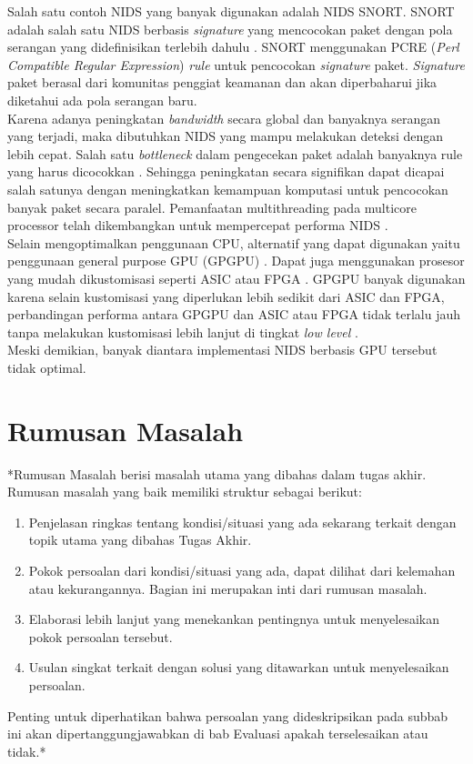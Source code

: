 Salah satu contoh NIDS yang banyak digunakan adalah NIDS SNORT. SNORT adalah salah satu NIDS berbasis \emph{signature} yang mencocokan paket dengan pola serangan yang didefinisikan terlebih dahulu \parencite{snort}. SNORT menggunakan PCRE (\emph{Perl Compatible Regular Expression}) \emph{rule} untuk pencocokan \emph{signature} paket. \emph{Signature} paket berasal dari komunitas penggiat keamanan dan akan diperbaharui jika diketahui ada pola serangan baru. \\
Karena adanya peningkatan \emph{bandwidth} secara global dan banyaknya serangan yang terjadi, maka dibutuhkan NIDS yang mampu melakukan deteksi dengan lebih cepat. Salah satu \emph{bottleneck} dalam pengecekan paket adalah banyaknya rule yang harus dicocokkan \parencite{pcre2007}. Sehingga peningkatan secara signifikan dapat dicapai salah satunya dengan meningkatkan kemampuan komputasi untuk pencocokan banyak paket secara paralel. Pemanfaatan multithreading pada multicore processor telah dikembangkan untuk mempercepat performa NIDS \parencite{multi2005}. \\
Selain mengoptimalkan penggunaan CPU, alternatif yang dapat digunakan yaitu penggunaan general purpose GPU (GPGPU) \parencite{gpu2008}. Dapat juga menggunakan prosesor yang mudah dikustomisasi seperti ASIC atau FPGA \parencite{fpga2008}. GPGPU banyak digunakan karena selain kustomisasi yang diperlukan lebih sedikit dari ASIC dan FPGA, perbandingan performa antara GPGPU dan ASIC atau FPGA tidak terlalu jauh tanpa melakukan kustomisasi lebih lanjut di tingkat \emph{low level} \parencite{gnort2008}. \\
Meski demikian, banyak diantara implementasi NIDS berbasis GPU tersebut tidak optimal.

\section{Rumusan Masalah}

*Rumusan Masalah berisi masalah utama yang dibahas dalam tugas akhir. Rumusan masalah yang baik memiliki struktur sebagai berikut:
\begin{enumerate}
    \item Penjelasan ringkas tentang kondisi/situasi yang ada sekarang terkait dengan topik utama yang dibahas Tugas Akhir.
    \item Pokok persoalan dari kondisi/situasi yang ada, dapat dilihat dari kelemahan atau kekurangannya. Bagian ini merupakan inti dari rumusan masalah.
    \item Elaborasi lebih lanjut yang menekankan pentingnya untuk menyelesaikan pokok persoalan tersebut.
    \item Usulan singkat terkait dengan solusi yang ditawarkan untuk menyelesaikan persoalan.
\end{enumerate}
Penting untuk diperhatikan bahwa persoalan yang dideskripsikan pada subbab ini akan dipertanggungjawabkan di bab Evaluasi apakah terselesaikan atau tidak.*

